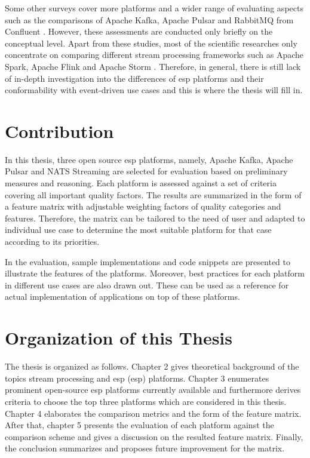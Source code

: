 Some other surveys cover more platforms and a wider range of evaluating aspects such as the comparisons of Apache Kafka, Apache Pulsar and RabbitMQ from Confluent \cite{overallcomparekafka} \cite{benchmarkkafkapulsarrabbitmq}. However, these assessments are conducted only briefly on the conceptual level. Apart from these studies, most of the scientific researches only concentrate on comparing different stream processing frameworks such as Apache Spark, Apache Flink and Apache Storm \cite{karimov2018benchmarking} \cite{isah2019survey} \cite{lopez2016performance}. Therefore, in general, there is still lack of in-depth investigation into the differences of \acrlong{esp} platforms and their conformability with event-driven use cases and this is where the thesis will fill in.
 
\section{Contribution}
In this thesis, three open source \acrlong{esp} platforms, namely, Apache Kafka, Apache Pulsar and NATS Streaming are selected for evaluation based on preliminary measures and reasoning. Each platform is assessed against a set of criteria covering all important quality factors. The results are summarized in the form of a feature matrix with adjustable weighting factors of quality categories and features. Therefore, the matrix can be tailored to the need of user and adapted to individual use case to determine the most suitable platform for that case according to its priorities.

In the evaluation, sample implementations and code snippets are presented to illustrate the features of the platforms. Moreover, best practices for each platform in different use cases are also drawn out. These can be used as a reference for actual implementation of applications on top of these platforms.

\section{Organization of this Thesis}
The thesis is organized as follows. Chapter 2 gives theoretical background of the topics stream processing and \acrlong{esp} (\acrshort{esp}) platforms. Chapter 3 enumerates prominent open-source \acrshort{esp} platforms currently available and furthermore derives criteria to choose the top three platforms which are considered in this thesis. Chapter 4 elaborates the comparison metrics and the form of the feature matrix. After that, chapter 5 presents the evaluation of each platform against the comparison scheme and gives a discussion on the resulted feature matrix. Finally, the conclusion summarizes and proposes future improvement for the matrix.

